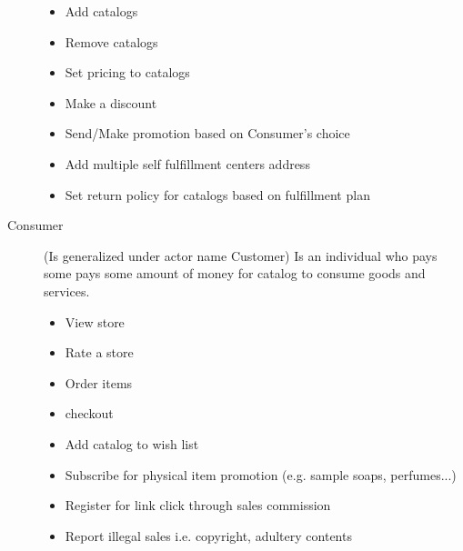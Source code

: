 \begin{description}
	\begin{itemize}
		\item Add catalogs
		\item Remove catalogs
		\item Set pricing to catalogs
		\item Make a discount
		\item Send/Make promotion based on Consumer's choice
		\item Add multiple self fulfillment centers address
		\item Set return policy for catalogs based on fulfillment plan
	\end{itemize}
	\item[Consumer] (Is generalized under actor name Customer) Is an individual who pays some pays some amount of money for catalog to consume goods and services.
	\begin{itemize}
		\item View store
		\item Rate a store
		\item Order items
		\item checkout
		\item Add catalog to wish list
		\item Subscribe for physical item promotion (e.g. sample soaps, perfumes...)
		\item Register for link click through sales commission
		\item Report illegal sales i.e. copyright, adultery contents
	\end{itemize}
\end{description} 

